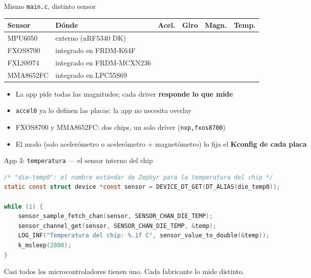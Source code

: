 \documentclass[aspectratio=169]{beamer}
\newcommand{\si}{\textcolor{green!50!black}{\ding{51}}}
\newcommand{\no}{\textcolor{gray!60}{\ding{55}}}
\begin{document}
\begin{frame}{Mismo \texttt{main.c}, distinto sensor}
\centering
\small
\begin{tabular}{llcccc}
\toprule
\textbf{Sensor} & \textbf{Dónde} & \textbf{Acel.} & \textbf{Giro} & \textbf{Magn.} & \textbf{Temp.} \\
\midrule
MPU6050 & externo (nRF5340 DK) & \si & \si & \no & \si \\
FXOS8700 & integrado en FRDM-K64F & \si & \no & \si & \no \\
FXLS8974 & integrado en FRDM-MCXN236 & \si & \no & \no & \si \\
MMA8652FC & integrado en LPC55S69 & \si & \no & \no & \no \\
\bottomrule
\end{tabular}

\vspace{1em}
\begin{itemize}
    \item La app pide todas las magnitudes; cada driver \textbf{responde lo que mide}
    \item \texttt{accel0} ya lo definen las placas: la app no necesita overlay
    \item FXOS8700 y MMA8652FC: dos chips, \alert{un solo driver} (\texttt{nxp,fxos8700})
    \item El modo (solo acelerómetro o acelerómetro + magnetómetro) lo fija el \textbf{Kconfig de cada placa}
\end{itemize}
\end{frame}

\begin{frame}[fragile]{App 3: \texttt{temperatura} --- el sensor interno del chip}
\begin{lstlisting}[language=C]
/* "die-temp0": el nombre estándar de Zephyr para la temperatura del chip */
static const struct device *const sensor = DEVICE_DT_GET(DT_ALIAS(die_temp0));

while (1) {
    sensor_sample_fetch_chan(sensor, SENSOR_CHAN_DIE_TEMP);
    sensor_channel_get(sensor, SENSOR_CHAN_DIE_TEMP, &temp);
    LOG_INF("Temperatura del chip: %.1f C", sensor_value_to_double(&temp));
    k_msleep(2000);
}
\end{lstlisting}
\vspace{0.3em}
\centering\small Casi todos los microcontroladores tienen uno. \alert{Cada fabricante lo mide distinto.}
\end{frame}
\end{document}
